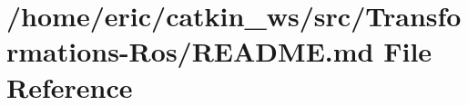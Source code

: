 \hypertarget{Transformations-Ros_2README_8md}{}\section{/home/eric/catkin\+\_\+ws/src/\+Transformations-\/\+Ros/\+R\+E\+A\+D\+ME.md File Reference}
\label{Transformations-Ros_2README_8md}
